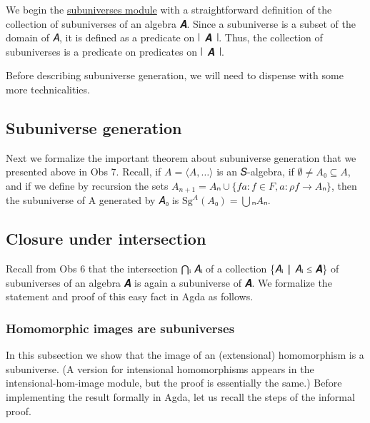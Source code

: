 \documentclass[sigplan,screen]{acmart}
\newcommand\subuniversesmodule{\href{https://gitlab.com/ualib/ualib.gitlab.io/-/blob/master/subuniverses.lagda.rst}{subuniverses module}\xspace}
\begin{document}
We begin the \subuniversesmodule with a straightforward definition of the collection of subuniverses of an algebra 𝑨. Since a subuniverse is a subset of the domain of 𝐴, it is defined as a predicate on ∣~𝑨~∣. Thus, the collection
of subuniverses is a predicate on predicates on ∣~𝑨~∣.
\begin{code}\end{code}
Before describing subuniverse generation, we will need to dispense with some more technicalities.
\begin{code}\end{code}

\subsection{Subuniverse generation}\label{subuniverse-generation}
Next we formalize the important theorem about subuniverse generation that we presented above in Obs 7. Recall, if \(A = ⟨𝐴, …⟩\) is an 𝑆-algebra, if \(∅ ≠ 𝐴₀ ⊆ 𝐴\), and if we define by recursion the sets \(A_{n+1} = Aₙ ∪ \{ f a : f ∈ F, a : ρ f → Aₙ \}\), then the subuniverse of A generated by 𝐴₀ is \(\mathrm{Sg}^A(A₀) = ⋃ₙ Aₙ\).
\begin{code}\end{code}

\subsection{Closure under intersection}\label{closure-under-intersection}
Recall from Obs 6 that the intersection ⋂ᵢ 𝐴ᵢ of a collection \{𝐴ᵢ ∣ 𝐴ᵢ ≤ 𝑨\} of subuniverses of an algebra 𝑨 is
again a subuniverse of 𝑨. We formalize the statement and proof of this easy fact in Agda as follows.
\begin{code}\end{code}

\subsubsection{Homomorphic images are subuniverses}\label{homomorphic-images-are-subuniverses}
In this subsection we show that the image of an (extensional)
homomorphism is a subuniverse. (A version for intensional homomorphisms
appears in the intensional-hom-image module, but the proof is
essentially the same.) Before implementing the result formally in Agda,
let us recall the steps of the informal proof.
\end{document}
